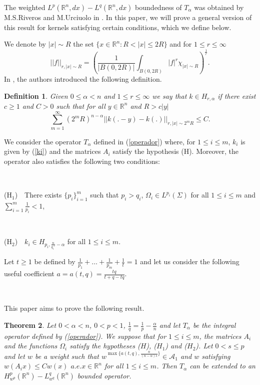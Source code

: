 \documentclass[a4paper,12pt,reqno]{amsart}
\numberwithin{equation}{section}
\newtheorem{theorem}{Theorem}[section]
\newtheorem{definition}[theorem]{Definition}
\begin{document}
	
	The weighted $L^p(\mathbb{R}^{n},dx)-L^q(\mathbb{R}^{n},dx)$ boundedness of $T_\alpha$ was obtained by M.\@ S.\@ Riveros and M.\@ Urciuolo in \cite{RiU2}.
	In this paper, we will prove a general version of this result for kernels satisfying certain conditions, which we define below.
	
	We denote by  $|x|\sim R$ the set $\{x\in \mathbb{R}^n: R<|x|\leq 2R\}$  and for $1\leq r\leq \infty$
	$$||f||_{r, |x|\sim R}=%
	\left(\frac 1{|B(0,2R)|}\int _{B(0,2R)}|f|^r\chi_{|x|\sim R}\right)^{\frac 1r}.$$
	In \cite {BLRi}, the authors introduced the following definition.
	
	\begin{definition}
		Given  $0\leq \alpha<n$ and  $1\leq r\leq \infty$ we say that
		$k \in H_{r, \alpha}$ if there exist $c\geq 1$ and  $C>0$ such that for all  $y\in \mathbb{R}^n$ and  $R>c|y|$
		$$
		\sum_{m=1}^{\infty}(2^mR)^{n-\alpha}||k(.-y)-k(.)||_{r, |x|\sim 2^mR}\leq C.
		$$
	\end{definition} 
	
	
	We consider the operator $T_\alpha$  defined in (\ref{operador}) where, for  $1\leq i\leq m$, $k_i$ is given by (\ref{ki}) and the matrices $A_i$ satisfy the hypothesis (H). Moreover, the operator also satisfies the following two conditions:
	
	\
	
	($\mathrm{H}_1$)\ \ There exists $\{p_i\}_{i=1}^{m}$ such that  $p_i>q_i$, $\Omega _i\in L^{p_i}(\Sigma)$ for all $1 \leq i \leq m$ and $\sum_{i=1}^{m} \frac{1}{p_i} < 1$,
	
	\
	
	
	($\mathrm{H}_2$)\ \  $k_i\in H_{p_i, \frac n{q_i' }-\alpha}$ for all $1 \leq i \leq m$.
	
	
	\medskip
	
	Let  $t\geq 1$  be  defined by  $\frac 1{p_1}+\dots+\frac 1{p_m}+\frac 1 t=1$ and let us consider the following useful coefficient $a=a(t,q)=\frac{tq}{t+q-tq}$.
	
	\ 
	
	This paper aims to prove the following result.
	
	\begin{theorem}\label{T-HpLq} Let $0< \alpha<n$, $0 < p <1$, $\frac 1q=\frac 1p-\frac {\alpha}n$ and let $T_\alpha$ be the integral operator defined by (\ref{operador}). We suppose that for $1\leq i\leq m$, the matrices $A_i$ and the functions $\Omega_i$ satisfy the hypotheses ($H$), ($H_1$) and ($H_2$). Let  $0<s\leq p$ and let $w$ be a weight such that $w^{\max\{a(t,q), \frac{n}{(n-\alpha)s}\}} \in \mathcal{A}_1$ and $w$ satisfying $w(A_ix)\leq Cw(x)$ $a.e.x \in \mathbb{R}^n$ for all $1\leq i\leq m$. Then $T_{\alpha}$ can be extended to an $H^{p}_{w^p}(\mathbb{R}^{n})-L^{q}_{w^q}(\mathbb{R}^{n})$ bounded operator.
	\end{theorem}	
	
\end{document}
